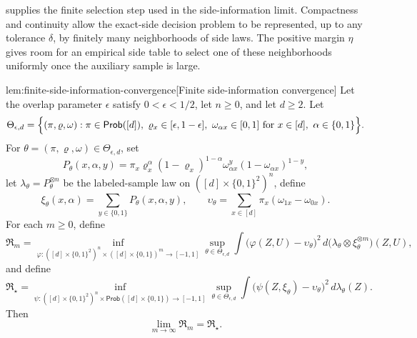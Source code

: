 \documentclass[11pt]{article}
\begin{document}
 supplies the finite selection step used in the side-information limit. Compactness and continuity allow the exact-side decision problem to be represented, up to any tolerance \(\delta\), by finitely many neighborhoods of side laws. The positive margin \(\eta\) gives room for an empirical side table to select one of these neighborhoods uniformly once the auxiliary sample is large.

\begin{lemmav}{lem:finite-side-information-convergence}[Finite side-information convergence]
Let the overlap parameter \(\epsilon\) satisfy \(0<\epsilon<1/2\), let \(n\ge0\), and let \(d\ge2\).  Let
\[
\Theta_{\epsilon,d}
=
\Bigl\{(\pi,\varrho,\omega):
\pi\in\mathsf{Prob}([d]),\
\varrho_x\in[\epsilon,1-\epsilon],\
\omega_{\alpha x}\in[0,1]\ \text{for }x\in[d],\ \alpha\in\{0,1\}
\Bigr\}.
\]
For \(\theta=(\pi,\varrho,\omega)\in\Theta_{\epsilon,d}\), set
\[
P_\theta(x,\alpha,y)
=
\pi_x\varrho_x^\alpha(1-\varrho_x)^{1-\alpha}
\omega_{\alpha x}^y(1-\omega_{\alpha x})^{1-y},
\]
let \(\lambda_\theta=P_\theta^{\otimes n}\) be the labeled-sample law on \(([d]\times\{0,1\}^2)^n\), define
\[
\xi_\theta(x,\alpha)=\sum_{y\in\{0,1\}}P_\theta(x,\alpha,y),
\qquad
\upsilon_\theta=\sum_{x\in[d]}\pi_x(\omega_{1x}-\omega_{0x}).
\]
For each \(m\ge0\), define
\[
\mathfrak R_m
=
\inf_{\varphi:([d]\times\{0,1\}^2)^n\times([d]\times\{0,1\})^m\to[-1,1]}
\sup_{\theta\in\Theta_{\epsilon,d}}
\int
\bigl(\varphi(Z,U)-\upsilon_\theta\bigr)^2\,
d\bigl(\lambda_\theta\otimes\xi_\theta^{\otimes m}\bigr)(Z,U),
\]
and define
\[
\mathfrak R_\star
=
\inf_{\psi:([d]\times\{0,1\}^2)^n\times\mathsf{Prob}([d]\times\{0,1\})\to[-1,1]}
\sup_{\theta\in\Theta_{\epsilon,d}}
\int
\bigl(\psi(Z,\xi_\theta)-\upsilon_\theta\bigr)^2\,
d\lambda_\theta(Z).
\]
Then
\[
\lim_{m\to\infty}\mathfrak R_m=\mathfrak R_\star .
\]
\end{lemmav}
\end{document}
